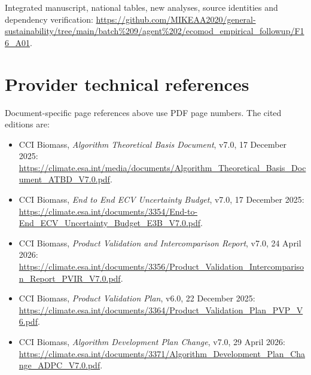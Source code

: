 \documentclass[11pt,a4paper]{article}
\begin{document}
Integrated manuscript, national tables, new analyses, source identities and dependency verification: \url{https://github.com/MIKEAA2020/general-sustainability/tree/main/batch%209/agent%202/ecomod_empirical_followup/F16_A01}.

\section{Provider technical references}
Document-specific page references above use PDF page numbers. The cited editions are:
\begin{itemize}
\item CCI Biomass, \emph{Algorithm Theoretical Basis Document}, v7.0, 17 December 2025: \url{https://climate.esa.int/media/documents/Algorithm_Theoretical_Basis_Document_ATBD_V7.0.pdf}.
\item CCI Biomass, \emph{End to End ECV Uncertainty Budget}, v7.0, 17 December 2025: \url{https://climate.esa.int/documents/3354/End-to-End_ECV_Uncertainty_Budget_E3B_V7.0.pdf}.
\item CCI Biomass, \emph{Product Validation and Intercomparison Report}, v7.0, 24 April 2026: \url{https://climate.esa.int/documents/3356/Product_Validation_Intercomparison_Report_PVIR_V7.0.pdf}.
\item CCI Biomass, \emph{Product Validation Plan}, v6.0, 22 December 2025: \url{https://climate.esa.int/documents/3364/Product_Validation_Plan_PVP_V6.pdf}.
\item CCI Biomass, \emph{Algorithm Development Plan Change}, v7.0, 29 April 2026: \url{https://climate.esa.int/documents/3371/Algorithm_Development_Plan_Change_ADPC_V7.0.pdf}.
\end{itemize}
\end{document}
